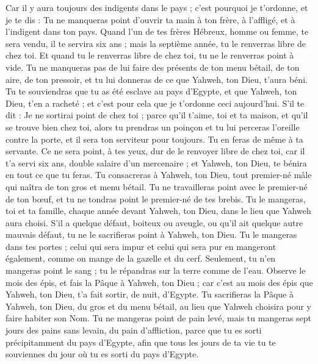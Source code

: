 \begin{multicols}{2}
Car il y aura toujours des indigents dans le pays ; c'est pourquoi je t'ordonne, et je te dis : Tu ne manqueras point d'ouvrir ta main à ton frère, à l'affligé, et à l'indigent dans ton pays.
Quand l'un de tes frères Hébreux, homme ou femme, te sera vendu, il te servira six ans ; mais la septième année, tu le renverras libre de chez toi.
Et quand tu le renverras libre de chez toi, tu ne le renverras point à vide.
Tu ne manqueras pas de lui faire des présents de ton menu bétail, de ton aire, de ton pressoir, et tu lui donneras de ce que Yahweh, ton Dieu, t'aura béni.
Tu te souviendras que tu as été esclave au pays d'Egypte, et que Yahweh, ton Dieu, t'en a racheté ; et c'est pour cela que je t'ordonne ceci aujourd'hui.
S'il te dit : Je ne sortirai point de chez toi ; parce qu'il t'aime, toi et ta maison, et qu'il se trouve bien chez toi,
alors tu prendras un poinçon et tu lui perceras l'oreille contre la porte, et il sera ton serviteur pour toujours. Tu en feras de même à ta servante.
Ce ne sera point, à tes yeux, dur de le renvoyer libre de chez toi, car il t'a servi six ans, double salaire d'un mercenaire ; et Yahweh, ton Dieu, te bénira en tout ce que tu feras.
Tu consacreras à Yahweh, ton Dieu, tout premier-né mâle qui naîtra de ton gros et menu bétail. Tu ne travailleras point avec le premier-né de ton bœuf, et tu ne tondras point le premier-né de tes brebis.
Tu le mangeras, toi et ta famille, chaque année devant Yahweh, ton Dieu, dans le lieu que Yahweh aura choisi.
S'il a quelque défaut, boiteux ou aveugle, ou qu'il ait quelque autre mauvais défaut, tu ne le sacrifieras point à Yahweh, ton Dieu.
Tu le mangeras dans tes portes ; celui qui sera impur et celui qui sera pur en mangeront également, comme on mange de la gazelle et du cerf.
Seulement, tu n'en mangeras point le sang ; tu le répandras sur la terre comme de l'eau.
\VerseOne{}Observe le mois des épis, et fais la Pâque à Yahweh, ton Dieu ; car c'est au mois des épis que Yahweh, ton Dieu, t'a fait sortir, de nuit, d'Egypte.
Tu sacrifieras la Pâque à Yahweh, ton Dieu, du gros et du menu bétail, au lieu que Yahweh choisira pour y faire habiter son Nom.
Tu ne mangeras point de pain levé, mais tu mangeras sept jours des pains sans levain, du pain d'affliction, parce que tu es sorti précipitamment du pays d'Egypte, afin que tous les jours de ta vie tu te souviennes du jour où tu es sorti du pays d'Egypte.

\end{multicols}

